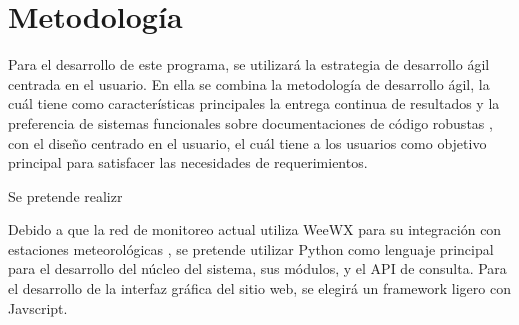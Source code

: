 \section{Metodología}

Para el desarrollo de este programa, se utilizará la estrategia de desarrollo ágil centrada en el usuario. En ella se combina la metodología de desarrollo ágil, la cuál tiene como características principales la entrega continua de resultados y la preferencia de sistemas funcionales sobre documentaciones de código robustas \cite{agile_manifesto}, con el diseño centrado en el usuario, el cuál tiene a los usuarios como objetivo principal para satisfacer las necesidades de requerimientos.

\cite{hussain_agile_usercentered}

Se pretende realizr

Debido a que la red de monitoreo actual utiliza WeeWX para su integración con estaciones meteorológicas \cite{red_climatologica_uacj}, se pretende utilizar Python como lenguaje principal para el desarrollo del núcleo del sistema, sus módulos, y el API de consulta. Para el desarrollo de la interfaz gráfica del sitio web, se elegirá un framework ligero con Javscript.
